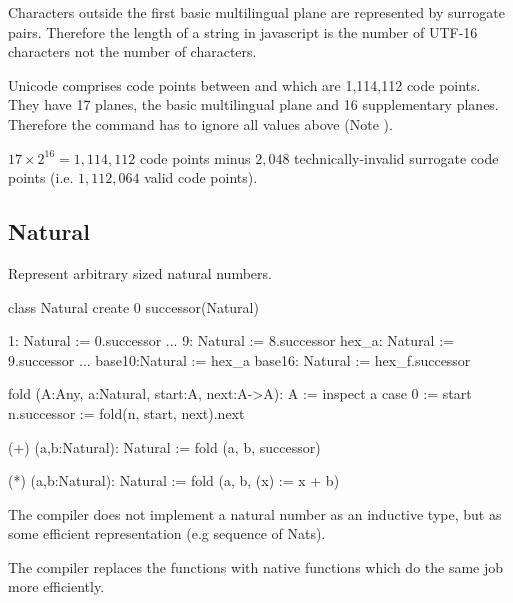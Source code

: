 Characters outside the first basic multilingual plane are represented by
surrogate pairs. Therefore the length of a string in javascript is the number
of UTF-16 characters not the number of characters.

Unicode comprises code points between  and  which are
1,114,112 code points. They have 17 planes, the basic multilingual plane and
16 supplementary planes. Therefore the command  has to
ignore all values above  (Note ).

$17 \times 2^{16} = 1,114,112$ code points minus $2,048$ technically-invalid
surrogate code points (i.e. $1,112,064$ valid code points).





\vskip 5mm
\subsection{Natural}


Represent arbitrary sized natural numbers.
%
\begin{alba}
  class Natural create
    0
    successor(Natural)

  1: Natural := 0.successor
  ...
  9: Natural := 8.successor
  hex_a: Natural := 9.successor
  ...
  base10:Natural  := hex_a
  base16: Natural := hex_f.successor

  fold (A:Any, a:Natural, start:A, next:A->A): A :=
    inspect a case
      0 :=
         start
      n.successor :=
         fold(n, start, next).next

  (+) (a,b:Natural): Natural :=
    fold (a, b, successor)

  (*) (a,b:Natural): Natural :=
    fold (a, b, (x) := x + b)
\end{alba}

The compiler does not implement a natural number as an inductive type, but as
some efficient representation (e.g sequence of Nats).

The compiler replaces the functions  with native functions which do the same job more efficiently.



